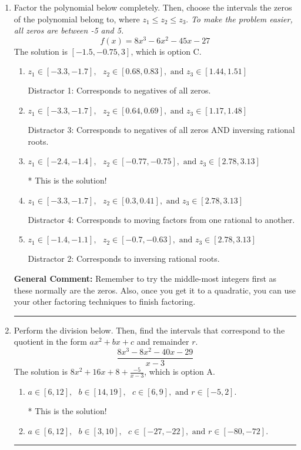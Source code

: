 \documentclass{extbook}[14pt]
\newcommand{\litem}[1]{\item #1

\rule{\textwidth}{0.4pt}}
\begin{document}
\begin{enumerate}\litem{
Factor the polynomial below completely. Then, choose the intervals the zeros of the polynomial belong to, where $z_1 \leq z_2 \leq z_3$. \textit{To make the problem easier, all zeros are between -5 and 5.}
\[ f(x) = 8x^{3} -6 x^{2} -45 x -27 \]The solution is \( [-1.5, -0.75, 3] \), which is option C.\begin{enumerate}[label=\Alph*.]
\item \( z_1 \in [-3.3, -1.7], \text{   }  z_2 \in [0.68, 0.83], \text{   and   } z_3 \in [1.44, 1.51] \)

 Distractor 1: Corresponds to negatives of all zeros.
\item \( z_1 \in [-3.3, -1.7], \text{   }  z_2 \in [0.64, 0.69], \text{   and   } z_3 \in [1.17, 1.48] \)

 Distractor 3: Corresponds to negatives of all zeros AND inversing rational roots.
\item \( z_1 \in [-2.4, -1.4], \text{   }  z_2 \in [-0.77, -0.75], \text{   and   } z_3 \in [2.78, 3.13] \)

* This is the solution!
\item \( z_1 \in [-3.3, -1.7], \text{   }  z_2 \in [0.3, 0.41], \text{   and   } z_3 \in [2.78, 3.13] \)

 Distractor 4: Corresponds to moving factors from one rational to another.
\item \( z_1 \in [-1.4, -1.1], \text{   }  z_2 \in [-0.7, -0.63], \text{   and   } z_3 \in [2.78, 3.13] \)

 Distractor 2: Corresponds to inversing rational roots.
\end{enumerate}

\textbf{General Comment:} Remember to try the middle-most integers first as these normally are the zeros. Also, once you get it to a quadratic, you can use your other factoring techniques to finish factoring.
}
\litem{
Perform the division below. Then, find the intervals that correspond to the quotient in the form $ax^2+bx+c$ and remainder $r$.
\[ \frac{8x^{3} -8 x^{2} -40 x -29}{x -3} \]The solution is \( 8x^{2} +16 x + 8 + \frac{-5}{x -3} \), which is option A.\begin{enumerate}[label=\Alph*.]
\item \( a \in [6, 12], \text{   } b \in [14, 19], \text{   } c \in [6, 9], \text{   and   } r \in [-5, 2]. \)

* This is the solution!
\item \( a \in [6, 12], \text{   } b \in [3, 10], \text{   } c \in [-27, -22], \text{   and   } r \in [-80, -72]. \)


\end{enumerate}}
\end{enumerate}
\end{document}
